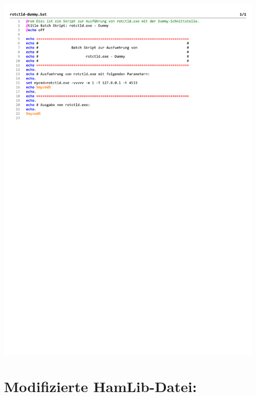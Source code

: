 \begin{center}
	\includegraphics[width=1\textwidth]{./appendicies/rotctld-dummy}
\end{center}


\chapter{Modifizierte HamLib-Datei: }
\label{chap:hamlibmodification}

